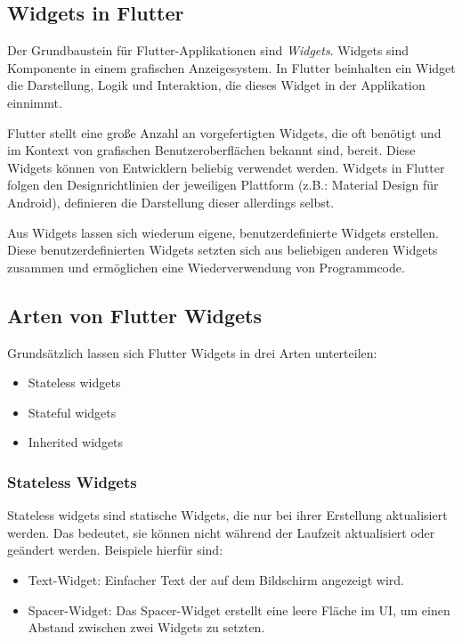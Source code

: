 \subsection{Widgets in Flutter}
Der Grundbaustein für Flutter-Applikationen sind \textit{Widgets}.
Widgets sind Komponente in einem grafischen Anzeigesystem. 
In Flutter beinhalten ein Widget die Darstellung, Logik und Interaktion, die dieses Widget in der Applikation einnimmt.


Flutter stellt eine große Anzahl an vorgefertigten Widgets, die oft benötigt und im Kontext von grafischen
Benutzeroberflächen bekannt sind, bereit. Diese Widgets können von Entwicklern beliebig verwendet werden.
Widgets in Flutter folgen den Designrichtlinien der jeweiligen Plattform (z.B.: Material Design für Android), 
definieren die Darstellung dieser allerdings selbst.

Aus Widgets lassen sich wiederum eigene, benutzerdefinierte Widgets erstellen.
Diese benutzerdefinierten Widgets setzten sich aus beliebigen anderen Widgets zusammen 
und ermöglichen eine Wiederverwendung von Programmcode. \cite{flutterwikipediaDE}

\subsection{Arten von Flutter Widgets}
Grundsätzlich lassen sich Flutter Widgets in drei Arten unterteilen:
 \begin{itemize}
    \item Stateless widgets
    \item Stateful widgets
    \item Inherited widgets
 \end{itemize}

\subsubsection{Stateless Widgets}
Stateless widgets sind statische Widgets, die nur bei ihrer Erstellung aktualisiert werden.
Das bedeutet, sie können nicht während der Laufzeit aktualisiert oder geändert werden. \cite{flutterstatelesswidgets}
Beispiele hierfür sind:
\begin{itemize}
    \item Text-Widget: Einfacher Text der auf dem Bildschirm angezeigt wird.
    \item Spacer-Widget: Das Spacer-Widget erstellt eine leere Fläche im UI,
    um einen Abstand zwischen zwei Widgets zu setzten.
\end{itemize}


